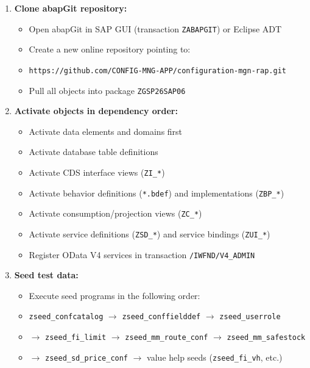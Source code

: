 \documentclass[12pt,a4paper]{report}
\begin{document}
\begin{enumerate}[leftmargin=2em]
  \item \textbf{Clone abapGit repository:}
    \begin{itemize}
      \item Open abapGit in SAP GUI (transaction \texttt{ZABAPGIT}) or Eclipse ADT
      \item Create a new online repository pointing to:
      \item[] \texttt{https://github.com/CONFIG-MNG-APP/configuration-mgn-rap.git}
      \item Pull all objects into package \texttt{ZGSP26SAP06}
    \end{itemize}

  \item \textbf{Activate objects in dependency order:}
    \begin{itemize}
      \item Activate data elements and domains first
      \item Activate database table definitions
      \item Activate CDS interface views (\texttt{ZI\_*})
      \item Activate behavior definitions (\texttt{*.bdef}) and implementations (\texttt{ZBP\_*})
      \item Activate consumption/projection views (\texttt{ZC\_*})
      \item Activate service definitions (\texttt{ZSD\_*}) and service bindings (\texttt{ZUI\_*})
      \item Register OData V4 services in transaction \texttt{/IWFND/V4\_ADMIN}
    \end{itemize}

  \item \textbf{Seed test data:}
    \begin{itemize}
      \item Execute seed programs in the following order:
      \item[] \texttt{zseed\_confcatalog} $\rightarrow$ \texttt{zseed\_conffielddef} $\rightarrow$ \texttt{zseed\_userrole}
      \item[] $\rightarrow$ \texttt{zseed\_fi\_limit} $\rightarrow$ \texttt{zseed\_mm\_route\_conf} $\rightarrow$ \texttt{zseed\_mm\_safestock}
      \item[] $\rightarrow$ \texttt{zseed\_sd\_price\_conf} $\rightarrow$ value help seeds (\texttt{zseed\_fi\_vh}, etc.)
    \end{itemize}
\end{enumerate}
\end{document}
